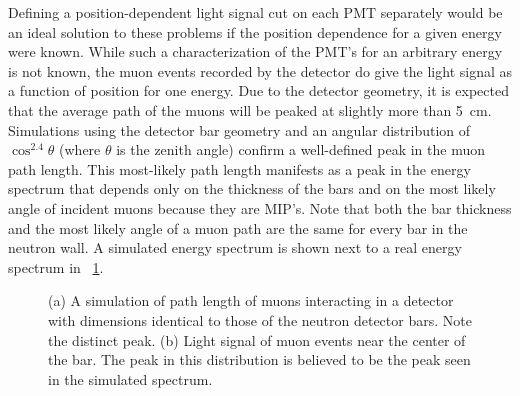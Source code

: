 Defining a position-dependent light signal cut on each PMT separately would be an ideal solution to these problems if the position dependence for a given energy were known.  While such a characterization of the PMT's for an arbitrary energy is not known, the muon events recorded by the detector do give the light signal as a function of position for one energy.  Due to the detector geometry, it is expected that the average path of the muons will be peaked at slightly more than 5~cm.  Simulations using the detector bar geometry and an angular distribution of $\cos^{2.4}{\theta}$ \citep{cosmicsZenithDependence} (where $\theta$ is the zenith angle) confirm a well-defined peak in the muon path length. This most-likely path length manifests as a peak in the energy spectrum that depends only on the thickness of the bars and on the most likely angle of incident muons because they are MIP's.  Note that both the bar thickness and the most likely angle of a muon path are the same for every bar in the neutron wall.  A simulated energy spectrum is shown next to a real energy spectrum in {\fig}~\ref{fig:muonSpectrum}. 
\begin{figure}[!htbp]
\centering
{}
\caption[Characteristic peak in energy spectrum due to muons.]{(a) A simulation of path length of muons interacting in a detector with dimensions identical to those of the neutron detector bars.  Note the distinct peak. (b) Light signal of muon events near the center of the bar.  The peak in this distribution is believed to be the peak seen in the simulated spectrum.}
\label{fig:muonSpectrum}
\end{figure}
